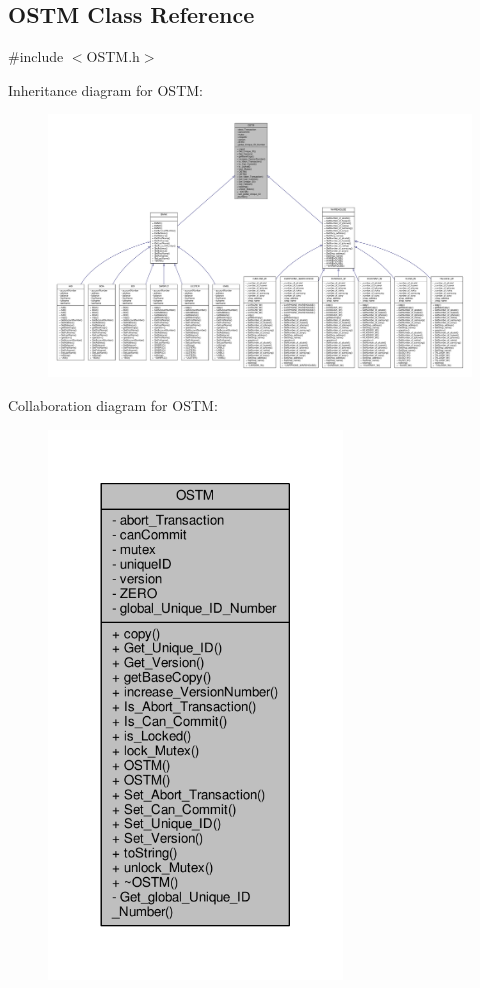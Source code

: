 \hypertarget{class_o_s_t_m}{}\subsection{O\+S\+TM Class Reference}
\label{class_o_s_t_m}


{\ttfamily \#include $<$O\+S\+T\+M.\+h$>$}



Inheritance diagram for O\+S\+TM\+:\nopagebreak
\begin{figure}[H]
\begin{center}
\leavevmode
\includegraphics[width=350pt]{class_o_s_t_m__inherit__graph}
\end{center}
\end{figure}


Collaboration diagram for O\+S\+TM\+:\nopagebreak
\begin{figure}[H]
\begin{center}
\leavevmode
\includegraphics[width=221pt]{class_o_s_t_m__coll__graph}
\end{center}
\end{figure}
